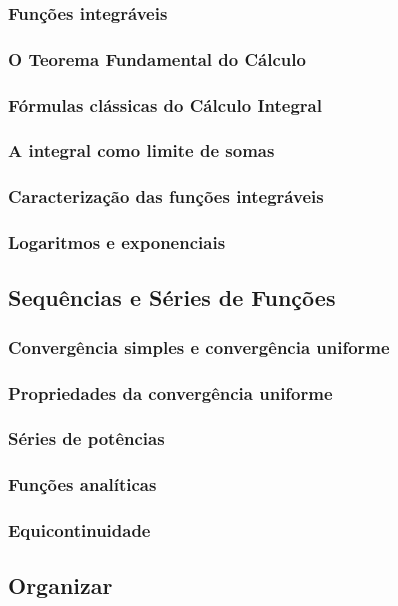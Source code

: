 \documentclass{article}
\theoremstyle{theorem}
\theoremstyle{lemma}
\theoremstyle{definition}
\theoremstyle{remark}
\begin{document}
   \subsubsection{ Funções integráveis}
   \subsubsection{ O Teorema Fundamental do Cálculo}
   \subsubsection{ Fórmulas clássicas do Cálculo Integral}
   \subsubsection{ A integral como limite de somas}
   \subsubsection{ Caracterização das funções integráveis}
   \subsubsection{ Logaritmos e exponenciais}
\subsection{ Sequências e Séries de Funções}
   \subsubsection{ Convergência simples e convergência uniforme}
   \subsubsection{ Propriedades da convergência uniforme}
   \subsubsection{ Séries de potências}
   \subsubsection{ Funções analíticas}
   \subsubsection{ Equicontinuidade}
\subsection{Organizar}
\end{document}
